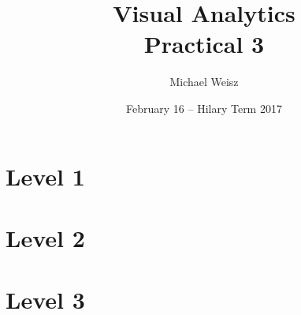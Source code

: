 \documentclass[]{article}
\title{Visual Analytics \\ Practical 3}
\author{Michael Weisz}
\date{February 16 -- Hilary Term 2017 }
\begin{document}
\maketitle

\section*{Level 1}


\section*{Level 2}


\section*{Level 3}
\end{document}
